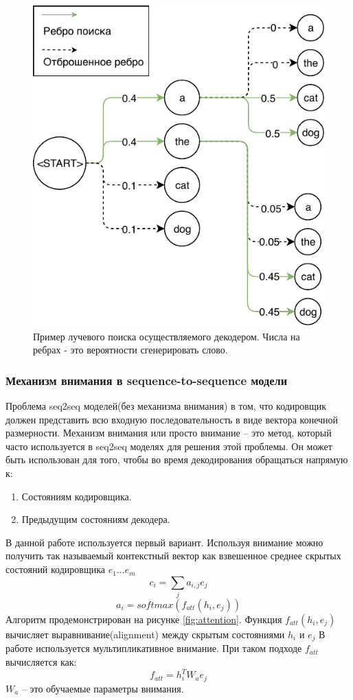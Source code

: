 \documentclass[14pt, a4paper]{extarticle}
\begin{document}
\begin{figure}[h]
\centering
\includegraphics[width=0.5\linewidth]{beam_search.pdf}
\caption{Пример лучевого поиска осуществляемого декодером. Числа на ребрах - это вероятности сгенерировать слово.}
\label{fig:beam_search}
\end{figure}

\subsubsection{Механизм внимания в sequence-to-sequence модели}
\label{attention_mechasm}
Проблема seq2seq моделей(без механизма внимания) в том, что кодировщик должен представить всю входную последовательность
в виде вектора конечной размерности.
Механизм внимания или просто внимание -- это метод, который часто используется в seq2seq моделях для решения этой проблемы.
Он может быть использован для того, чтобы во время декодирования обращаться напрямую к:
\begin{enumerate}
  \item Состояниям кодировщика.
  \item Предыдущим состояниям декодера.
\end{enumerate}
В данной работе используется первый вариант.
Используя внимание можно получить так называемый контекстный вектор как взвешенное среднее скрытых состояний кодировщика $e_1 ... e_m$
$$ c_i = \sum\limits_j a_{i, j} e_j $$
$$ a_i = softmax(f_{att}(h_i, e_j)) $$
Алгоритм продемонстрирован на рисунке \ref{fig:attention}.
Функция $f_{att}(h_i, e_j)$ вычисляет выравнивание(alignment) между скрытым состояниями $h_i$ и $e_j$
В работе используется мультипликативное внимание.
При таком подходе $f_{att}$ вычисляется как:
$$ f_{att} = h_i^T W_a e_j  $$
$W_a$ -- это обучаемые параметры внимания.
\end{document}
